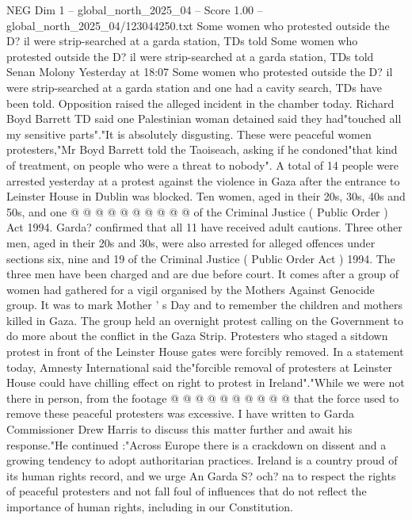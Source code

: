 \begin{textsample}{NEG Dim 1 – global\_north\_2025\_04 – Score 1.00 – global\_north\_2025\_04/123044250.txt}  \label{ex:f1_neg_040}
Some women who protested outside the D? il were strip-searched at a garda station, TDs told Some women who protested outside the D? il were strip-searched at a garda station, TDs told Senan Molony Yesterday at 18:07 Some women who protested outside the D? il were strip-searched at a garda station and one had a cavity search, TDs have been told.
Opposition raised the alleged incident in the chamber today.
Richard Boyd Barrett TD said one Palestinian woman detained said they had"touched all my sensitive parts"."It is absolutely disgusting.
These were peaceful women protesters,"Mr Boyd Barrett told the Taoiseach, asking if he condoned"that kind of treatment, on people who were a threat to nobody".
A total of 14 people were arrested yesterday at a protest against the violence in Gaza after the entrance to Leinster House in Dublin was blocked.
Ten women, aged in their 20s, 30s, 40s and 50s, and one @ @ @ @ @ @ @ @ @ @ of the Criminal Justice ( Public Order ) Act 1994.
Garda? confirmed that all 11 have received adult cautions.
Three other men, aged in their 20s and 30s, were also arrested for alleged offences under sections six, nine and 19 of the Criminal Justice ( Public Order Act ) 1994.
The three men have been charged and are due before court.
It comes after a group of women had gathered for a vigil organised by the Mothers Against Genocide group.
It was to mark Mother ' s Day and to remember the children and mothers killed in Gaza.
The group held an overnight protest calling on the Government to do more about the conflict in the Gaza Strip.
Protesters who staged a sitdown protest in front of the Leinster House gates were forcibly removed.
In a statement today, Amnesty International said the"forcible removal of protesters at Leinster House could have chilling effect on right to protest in Ireland"."While we were not there in person, from the footage @ @ @ @ @ @ @ @ @ @ that the force used to remove these peaceful protesters was excessive.
I have written to Garda Commissioner Drew Harris to discuss this matter further and await his response."He continued :"Across Europe there is a crackdown on dissent and a growing tendency to adopt authoritarian practices.
Ireland is a country proud of its human rights record, and we urge An Garda S? och? na to respect the rights of peaceful protesters and not fall foul of influences that do not reflect the importance of human rights, including in our Constitution.

\end{textsample}
